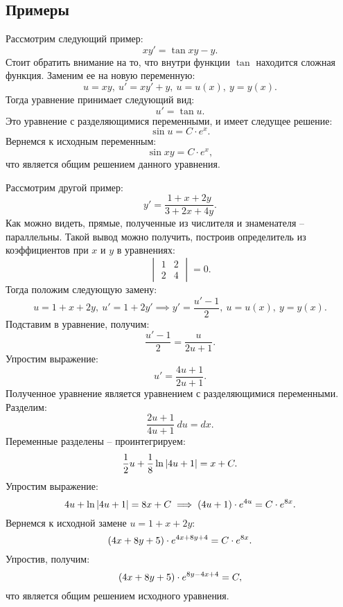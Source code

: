 	\subsection{Примеры}

		Рассмотрим следующий пример:
		\[ xy' = \tan{xy} - y. \]
		Стоит обратить внимание на то, что внутри функции $\tan$ находится сложная функция. Заменим ее на новую переменную:
		\[ u = xy, ~ u' = xy' + y, ~ u = u(x), ~ y = y(x). \]
		Тогда уравнение принимает следующий вид:
		\[ u' = \tan{u}. \]
		Это уравнение с разделяющимися переменными, и имеет следущее решение:
		\[ \sin{u} = C \cdot e^{x}. \]
		Вернемся к исходным переменным:
		\[ \sin{xy} = C \cdot e^{x}, \]
		что является общим решением данного уравнения.

		Рассмотрим другой пример:
		\[ y' = \frac{1 + x + 2y}{3 + 2x + 4y}. \]
		Как можно видеть, прямые, полученные из числителя и знаменателя -- параллельны. Такой вывод можно получить, построив определитель из коэффициентов при $x$ и $y$ в уравнениях:
		\[ \begin{vmatrix} 1 & 2 \\ 2 & 4 \end{vmatrix} = 0. \]
		Тогда положим следующую замену:
		\[ u = 1 + x + 2y, ~ u' = 1 + 2y' \implies y' = \frac{u' - 1}{2}, ~ u = u(x), ~ y = y(x). \]
		Подставим в уравнение, получим:
		\[ \frac{u' - 1}{2} = \frac{u}{2u + 1}. \]
		Упростим выражение:
		\[ u' = \frac{4u + 1}{2u + 1}. \]
		Полученное уравнение является уравнением с разделяющимися переменными. Разделим:
		\[ \frac{2u + 1}{4u + 1} ~ du = dx. \]
		Переменные разделены -- проинтегрируем:
		\[ \frac{1}{2} u + \frac{1}{8} \ln \left\vert 4u + 1 \right\vert = x + C. \]
		Упростим выражение:
		\[ 4u + \ln\left\vert 4u + 1 \right\vert = 8x + C \implies \left( 4u + 1 \right) \cdot e^{4u} = C \cdot e^{8x}. \]
		Вернемся к исходной замене $u = 1 + x + 2y$:
		\[ \left( 4x + 8y + 5 \right) \cdot e^{4x + 8y + 4} = C \cdot e^{8x}. \]
		Упростив, получим:
		\[ \left( 4x + 8y + 5 \right) \cdot e^{8y - 4x + 4} = C, \]
		что является общим решением исходного уравнения.

